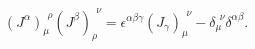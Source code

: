 \begin{equation*}
(J^\alpha)_\mu^{\!~~\rho} (J^\beta)_\rho^{\!~~\nu} =
\epsilon^{\alpha\beta\gamma} (J_\gamma)_\mu^{\!~~\nu} -
\delta_\mu^{\!~~\nu} \delta^{\alpha\beta}.
\end{equation*}

